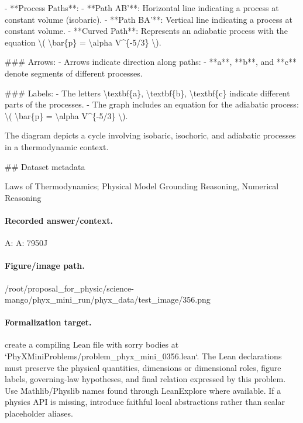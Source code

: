 - **Process Paths**:
  - **Path AB'**: Horizontal line indicating a process at constant volume (isobaric).
  - **Path BA'**: Vertical line indicating a process at constant volume.
  - **Curved Path**: Represents an adiabatic process with the equation \textbackslash{}( \textbackslash{}bar\{p\} = \textbackslash{}alpha V\textasciicircum{}\{-5/3\} \textbackslash{}).

\#\#\# Arrows:
- Arrows indicate direction along paths: 
  - **a**, **b**, and **c** denote segments of different processes.
  
\#\#\# Labels:
- The letters \textbackslash{}textbf\{a\}, \textbackslash{}textbf\{b\}, \textbackslash{}textbf\{c\} indicate different parts of the processes.
- The graph includes an equation for the adiabatic process: \textbackslash{}( \textbackslash{}bar\{p\} = \textbackslash{}alpha V\textasciicircum{}\{-5/3\} \textbackslash{}).

The diagram depicts a cycle involving isobaric, isochoric, and adiabatic processes in a thermodynamic context.

\#\# Dataset metadata

Laws of Thermodynamics; Physical Model Grounding Reasoning, Numerical Reasoning

\paragraph{Recorded answer/context.}
A: A: 7950J

\paragraph{Figure/image path.}
/root/proposal\_for\_physic/science-mango/phyx\_mini\_run/phyx\_data/test\_image/356.png

\paragraph{Formalization target.}
create a compiling Lean file with sorry bodies at `PhyXMiniProblems/problem\_phyx\_mini\_0356.lean`. The Lean declarations must preserve the physical quantities, dimensions or dimensional roles, figure labels, governing-law hypotheses, and final relation expressed by this problem.
Use Mathlib/Physlib names found through LeanExplore where available. If a physics API is missing, introduce faithful local abstractions rather than scalar placeholder aliases.

